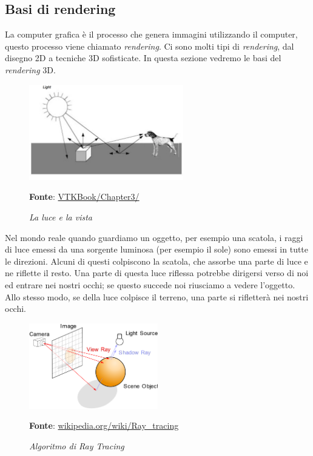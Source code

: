 \subsection{Basi di rendering}\label{sec:basi-rendering}
La computer grafica è il processo che genera immagini utilizzando il computer, questo processo viene chiamato \emph{rendering}. Ci sono molti tipi di \emph{rendering}, dal disegno 2D a tecniche 3D sofisticate. In questa sezione vedremo le basi del \emph{rendering} 3D.

\begin{figure}[h]
    \centering
    \includegraphics[width=0.6\textwidth]{immagini/volumerendering/lightpropagation.png}
    \caption{\textit{La luce e la vista}}
    \textbf{Fonte}: \href{https://lorensen.github.io/VTKExamples/site/VTKBook/03Chapter3/}{VTKBook/Chapter3/}
    \label{fig: Propagazione della luce}
\end{figure}

Nel mondo reale quando guardiamo un oggetto, per esempio una scatola, i raggi di luce emessi da una sorgente luminosa (per esempio il sole) sono emessi in tutte le direzioni. Alcuni di questi colpiscono la scatola, che assorbe una parte di luce e ne riflette il resto. Una parte di questa luce riflessa potrebbe dirigersi verso di noi ed entrare nei nostri occhi; se questo succede noi riusciamo a vedere l'oggetto. Allo stesso modo, se della luce colpisce il terreno, una parte si rifletterà nei nostri occhi.

\begin{figure}[h]
    \centering
    \includegraphics[width=0.5\textwidth]{immagini/volumerendering/ray_tracing_diagram.png}
    \caption{\textit{Algoritmo di Ray Tracing}}
    \textbf{Fonte}: \href{https://en.wikipedia.org/wiki/Ray_tracing_(graphics)}{wikipedia.org/wiki/Ray\_tracing}
    \label{fig: Algoritmo di Ray Tracing}
\end{figure}


